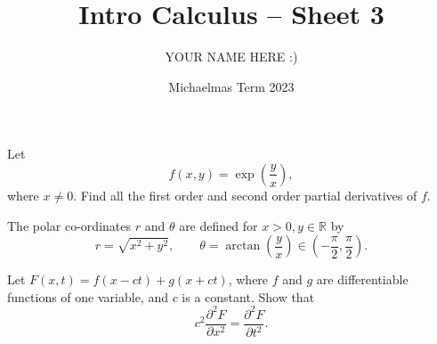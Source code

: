 \documentclass[answers]{exam}
\title{Intro Calculus -- Sheet 3}
\author{YOUR NAME HERE :)}
\date{Michaelmas Term 2023}
\begin{document}
\maketitle
\begin{questions}

\question%
Let \[
	f(x, y)=\exp \left(\frac{y}{x}\right),
\] where $x \neq 0$. Find all the first order and second order partial derivatives of $f$.



\question%
The polar co-ordinates $r$ and $\theta$ are defined for $x>0, y \in \mathbb{R}$ by \[
	r=\sqrt{x^{2}+y^{2}}, \qquad
	\theta=\arctan\left(\frac yx\right)\in\left(-\frac\pi2,\frac\pi2\right).
\]



\question%
Let $F(x, t)=f(x-c t)+g(x+c t)$, where $f$ and $g$ are differentiable functions of one variable, and $c$ is a constant. Show that \[
	c^2\frac{\partial^2F}{\partial x^2}=\frac{\partial^2F}{\partial t^2}.
\]




\end{questions}
\end{document}
